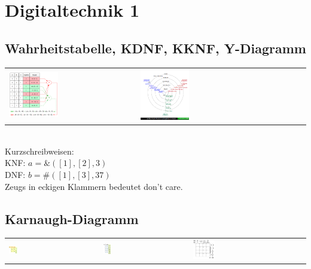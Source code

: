 \section{Digitaltechnik 1}
\subsection{Wahrheitstabelle, KDNF, KKNF, Y-Diagramm}
\begin{tabular}{ll}
  \includegraphics[width=0.4\textwidth]{pics/KNFDNF} &
  \includegraphics[width=0.3\textwidth]{pics/ydiagramm}
\end{tabular}
\\
Kurzschreibweisen:\\
KNF: $ a = \&([1],[2],3) $ \\
DNF: $ b = \#([1],[3],37) $ \\
Zeugs in eckigen Klammern bedeutet don't care.
\subsection{Karnaugh-Diagramm}
\begin{tabular}{lll}
  \includegraphics[width=0.1\textwidth]{pics/kv/2erKV} & 
  \includegraphics[width=0.1\textwidth]{pics/kv/3erKV} &
  \includegraphics[width=0.2\textwidth]{pics/kv/4erKV}\\
\end{tabular}
